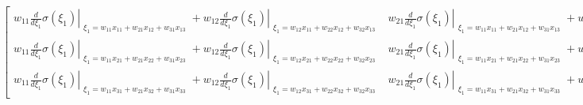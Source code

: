 \documentclass[11pt]{article}
\begin{document}
    $\displaystyle \left[\begin{matrix}w_{11} \left. \frac{d}{d \xi_{1}} \sigma{\left(\xi_{1} \right)} \right|_{\substack{ \xi_{1}=w_{11} x_{11} + w_{21} x_{12} + w_{31} x_{13} }} + w_{12} \left. \frac{d}{d \xi_{1}} \sigma{\left(\xi_{1} \right)} \right|_{\substack{ \xi_{1}=w_{12} x_{11} + w_{22} x_{12} + w_{32} x_{13} }} & w_{21} \left. \frac{d}{d \xi_{1}} \sigma{\left(\xi_{1} \right)} \right|_{\substack{ \xi_{1}=w_{11} x_{11} + w_{21} x_{12} + w_{31} x_{13} }} + w_{22} \left. \frac{d}{d \xi_{1}} \sigma{\left(\xi_{1} \right)} \right|_{\substack{ \xi_{1}=w_{12} x_{11} + w_{22} x_{12} + w_{32} x_{13} }} & w_{31} \left. \frac{d}{d \xi_{1}} \sigma{\left(\xi_{1} \right)} \right|_{\substack{ \xi_{1}=w_{11} x_{11} + w_{21} x_{12} + w_{31} x_{13} }} + w_{32} \left. \frac{d}{d \xi_{1}} \sigma{\left(\xi_{1} \right)} \right|_{\substack{ \xi_{1}=w_{12} x_{11} + w_{22} x_{12} + w_{32} x_{13} }}\\w_{11} \left. \frac{d}{d \xi_{1}} \sigma{\left(\xi_{1} \right)} \right|_{\substack{ \xi_{1}=w_{11} x_{21} + w_{21} x_{22} + w_{31} x_{23} }} + w_{12} \left. \frac{d}{d \xi_{1}} \sigma{\left(\xi_{1} \right)} \right|_{\substack{ \xi_{1}=w_{12} x_{21} + w_{22} x_{22} + w_{32} x_{23} }} & w_{21} \left. \frac{d}{d \xi_{1}} \sigma{\left(\xi_{1} \right)} \right|_{\substack{ \xi_{1}=w_{11} x_{21} + w_{21} x_{22} + w_{31} x_{23} }} + w_{22} \left. \frac{d}{d \xi_{1}} \sigma{\left(\xi_{1} \right)} \right|_{\substack{ \xi_{1}=w_{12} x_{21} + w_{22} x_{22} + w_{32} x_{23} }} & w_{31} \left. \frac{d}{d \xi_{1}} \sigma{\left(\xi_{1} \right)} \right|_{\substack{ \xi_{1}=w_{11} x_{21} + w_{21} x_{22} + w_{31} x_{23} }} + w_{32} \left. \frac{d}{d \xi_{1}} \sigma{\left(\xi_{1} \right)} \right|_{\substack{ \xi_{1}=w_{12} x_{21} + w_{22} x_{22} + w_{32} x_{23} }}\\w_{11} \left. \frac{d}{d \xi_{1}} \sigma{\left(\xi_{1} \right)} \right|_{\substack{ \xi_{1}=w_{11} x_{31} + w_{21} x_{32} + w_{31} x_{33} }} + w_{12} \left. \frac{d}{d \xi_{1}} \sigma{\left(\xi_{1} \right)} \right|_{\substack{ \xi_{1}=w_{12} x_{31} + w_{22} x_{32} + w_{32} x_{33} }} & w_{21} \left. \frac{d}{d \xi_{1}} \sigma{\left(\xi_{1} \right)} \right|_{\substack{ \xi_{1}=w_{11} x_{31} + w_{21} x_{32} + w_{31} x_{33} }} + w_{22} \left. \frac{d}{d \xi_{1}} \sigma{\left(\xi_{1} \right)} \right|_{\substack{ \xi_{1}=w_{12} x_{31} + w_{22} x_{32} + w_{32} x_{33} }} & w_{31} \left. \frac{d}{d \xi_{1}} \sigma{\left(\xi_{1} \right)} \right|_{\substack{ \xi_{1}=w_{11} x_{31} + w_{21} x_{32} + w_{31} x_{33} }} + w_{32} \left. \frac{d}{d \xi_{1}} \sigma{\left(\xi_{1} \right)} \right|_{\substack{ \xi_{1}=w_{12} x_{31} + w_{22} x_{32} + w_{32} x_{33} }}\end{matrix}\right]$
\end{document}
